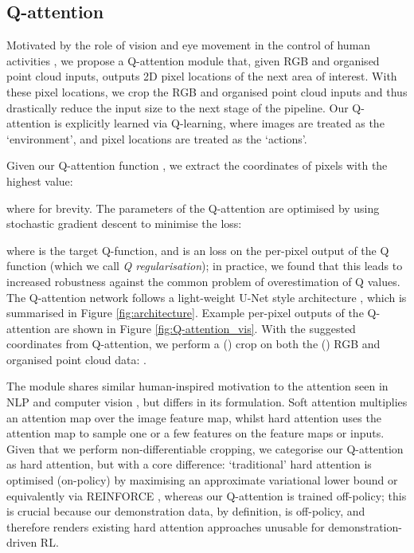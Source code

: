 \documentclass[letterpaper, 10 pt, journal, twoside]{IEEEtran}
\begin{document}
\subsection{Q-attention}
\label{sec:phase1}

Motivated by the role of vision and eye movement in the control of human activities \cite{land1999roles}, we propose a Q-attention module that, given RGB and organised point cloud inputs, outputs 2D pixel locations of the next area of interest. With these pixel locations, we crop the RGB and organised point cloud inputs and thus drastically reduce the input size to the next stage of the pipeline. Our Q-attention is explicitly learned via Q-learning, where images are treated as the `environment', and pixel locations are treated as the `actions'.

Given our Q-attention function , we extract the coordinates of pixels with the highest value:

where  for brevity. The parameters of the Q-attention are optimised by using stochastic gradient descent to minimise the loss:

where  is the target Q-function, and  is an  loss on the per-pixel output of the Q function (which we call \textit{Q regularisation}); in practice, we found that this leads to increased robustness against the common problem of overestimation of Q values. The Q-attention network follows a light-weight U-Net style architecture \cite{ronneberger2015u}, which is summarised in Figure \ref{fig:architecture}. Example per-pixel outputs of the Q-attention are shown in Figure \ref{fig:Q-attention_vis}. With the suggested coordinates from Q-attention, we perform a () crop on both the () RGB and organised point cloud data: .

The module shares similar human-inspired motivation to the attention seen in NLP \cite{bahdanau2014neural, vaswani2017attention, devlin2018bert} and computer vision \cite{xu2015show, zhang2019self}, but differs in its formulation. Soft attention multiplies an attention map over the image feature map, whilst hard attention uses the attention map to sample one or a few features on the feature maps or inputs. Given that we perform non-differentiable cropping, we categorise our Q-attention as hard attention, but with a core difference: `traditional' hard attention is optimised (on-policy) by maximising an approximate variational lower bound or equivalently via REINFORCE \cite{williams1992simple}, whereas our Q-attention is trained off-policy; this is crucial because our demonstration data, by definition, is off-policy, and therefore renders existing hard attention approaches unusable for demonstration-driven RL.
\end{document}
